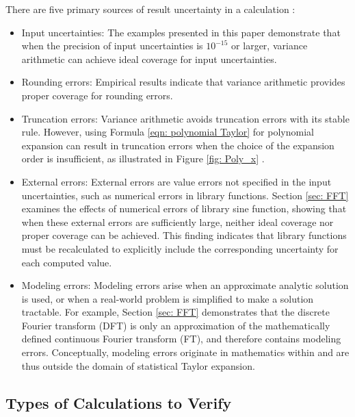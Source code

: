 \documentclass[twoside]{article}
\numberwithin{equation}{section}
\begin{document}
There are five primary sources of result uncertainty in a calculation \cite{Statistical_Methods}\cite{Numerical_Recipes}\cite{Prev_Precision_Arithmetic}:
\begin{itemize}
\item Input uncertainties:
The examples presented in this paper demonstrate that when the precision of input uncertainties is $10^{-15}$ or larger, variance arithmetic can achieve ideal coverage for input uncertainties.

\item Rounding errors:
Empirical results indicate that variance arithmetic provides proper coverage for rounding errors.

\item Truncation errors:
Variance arithmetic avoids truncation errors with its stable rule.
However, using Formula \eqref{eqn: polynomial Taylor} for polynomial expansion can result in truncation errors when the choice of the expansion order is insufficient, as illustrated in Figure \ref{fig: Poly_x} .

\item External errors:
External errors are value errors not specified in the input uncertainties, such as numerical errors in library functions.
Section \ref{sec: FFT} examines the effects of numerical errors of library sine function, showing that when these external errors are sufficiently large, neither ideal coverage nor proper coverage can be achieved.
This finding indicates that library functions must be recalculated to explicitly include the corresponding uncertainty for each computed value.

\item Modeling errors: 
Modeling errors arise when an approximate analytic solution is used, or when a real-world problem is simplified to make a solution tractable.  
For example, Section \ref{sec: FFT} demonstrates that the discrete Fourier transform (DFT) is only an approximation of the mathematically defined continuous Fourier transform (FT), and therefore contains modeling errors.  
Conceptually, modeling errors originate in mathematics within and are thus outside the domain of statistical Taylor expansion.

\end{itemize}







\subsection{Types of Calculations to Verify}
\end{document}
